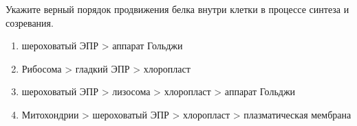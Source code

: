 
Укажите верный порядок продвижения белка
внутри клетки в процессе синтеза и созревания.

\begin{enumerate}
    \item шероховатый ЭПР > аппарат Гольджи
    \item Рибосома > гладкий ЭПР > хлоропласт 
    \item шероховатый ЭПР > лизосома > хлоропласт > аппарат Гольджи 
    \item Митохондрии > шероховатый ЭПР > хлоропласт > плазматическая мембрана
\end{enumerate}

